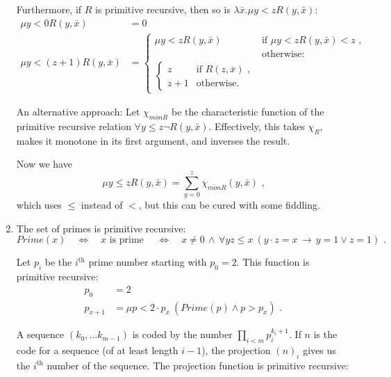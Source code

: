 \documentclass[a4paper,11pt]{article}
\begin{document}
\begin{enumerate}
Furthermore, if $R$ is primitive recursive, then so is $\lambda \bar{x}. \mu y \! < \! z R(y, \bar{x})$:
\begin{align*}
  \mu y \! < \! 0 R(y, \bar{x})             &= 0\\
  \mu y \! < \! (z \! + \! 1) R(y, \bar{x}) &=
  \begin{cases}
    \mu y \! < \! z R(y, \bar{x}) & \text{if $\mu y \! < \! z R(y, \bar{x}) < z$ ,}\\
                                  & \text{otherwise:}\\
    \begin{cases}
       z     & \text{if $R(z, \bar{x})$ ,}\\
       z + 1 & \text{otherwise.}
    \end{cases}
  \end{cases}
\end{align*}

An alternative approach: Let $\chi_{\overline{mon}R}$ be the characteristic function of the
primitive recursive relation $\forall y \! \leq \! z \neg R(y, \bar{x})$.
Effectively, this takes $\chi_R$, makes it monotone in its first argument,
and inverses the result.

Now we have
\begin{equation*}
  \mu y \! \leq \! z R(y, \bar{x}) = \sum^{z}_{y=0} \chi_{\overline{mon}R}(y, \bar{x}) \text{ ,}
\end{equation*}
which uses $\leq$ instead of $<$, but this can be cured with some fiddling.


\item %
The set of primes is primitive recursive:
\begin{equation*}
  Prime(x) \quad \Leftrightarrow \quad
  x \text{ is prime } \quad \Leftrightarrow \quad
  x \neq 0 \, \wedge \, \forall y z \! \leq \! x \: (y \! \cdot \! z = x \, \rightarrow \, y = 1 \vee z = 1) \text{ .}
\end{equation*}

Let $p_i$ be the $i^{\text{th}}$ prime number starting with $p_0 = 2$.
This function is primitive recursive:
\begin{align*}
  p_0    &= 2 \\
  p_{x+1} &= \mu p \! < \! 2 \! \cdot \! p_x \: (Prime(p) \wedge p > p_x) \text{ .}
\end{align*}


A sequence $(k_0, \ldots k_{m\!-\!1})$ is coded by the number $\prod_{i<m} p_i^{k_i+1}$.
If $n$ is the code for a sequence (of at least length $i-1$), the projection
$(n)_i$ gives us the $i^\text{th}$ number of the sequence.
The projection function is primitive recursive:


\end{enumerate}
\end{document}
